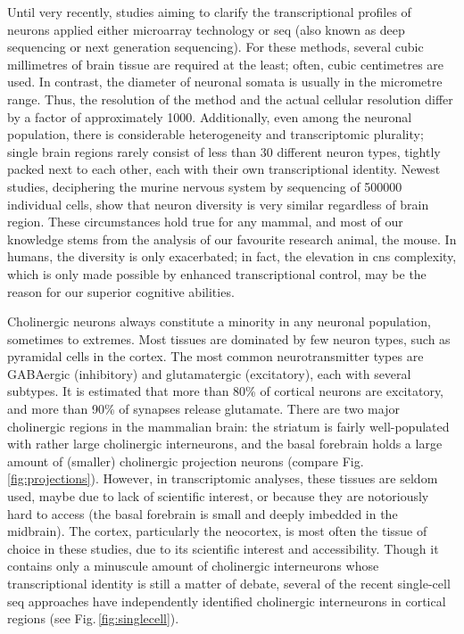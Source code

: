 Until very recently, studies aiming to clarify the transcriptional profiles of neurons applied either microarray technology or \ac{seq} (also known as deep sequencing or next generation sequencing). For these methods, several cubic millimetres of brain tissue are required at the least; often, cubic centimetres are used. In contrast, the diameter of neuronal somata is usually in the micrometre range. Thus, the resolution of the method and the actual cellular resolution differ by a factor of approximately \num{1000}. Additionally, even among the neuronal population, there is considerable heterogeneity and transcriptomic plurality; single brain regions rarely consist of less than 30 different neuron types, tightly packed next to each other, each with their own transcriptional identity.\cite{Darmanis2015, Zeisel2015, Tasic2016, Habib2016} Newest studies, deciphering the murine nervous system by sequencing of \num{500000} individual cells, show that neuron diversity is very similar regardless of brain region.\cite{Zeisel2018} These circumstances hold true for any mammal, and most of our knowledge stems from the analysis of our favourite research animal, the mouse. In humans, the diversity is only exacerbated; in fact, the elevation in \ac{cns} complexity, which is only made possible by enhanced transcriptional control, may be the reason for our superior cognitive abilities.\cite{Ataman2016, Hardingham2018, Yap2018}

Cholinergic neurons always constitute a minority in any neuronal population, sometimes to extremes. Most tissues are dominated by few neuron types, such as pyramidal cells in the cortex. The most common neurotransmitter types are GABAergic (inhibitory) and glutamatergic (excitatory), each with several subtypes. It is estimated that more than 80\% of cortical neurons are excitatory, and more than 90\% of synapses release glutamate.\cite{Raichle2002} There are two major cholinergic regions in the mammalian brain: the striatum is fairly well-populated with rather large cholinergic interneurons, and the basal forebrain holds a large amount of (smaller) cholinergic projection neurons (compare Fig.\,\ref{fig:projections}). However, in transcriptomic analyses, these tissues are seldom used, maybe due to lack of scientific interest, or because they are notoriously hard to access (the basal forebrain is small and deeply imbedded in the midbrain). The cortex, particularly the neocortex, is most often the tissue of choice in these studies, due to its scientific interest and accessibility. Though it contains only a minuscule amount of cholinergic interneurons whose transcriptional identity is still a matter of debate, several of the recent single-cell \ac{seq} approaches have independently identified cholinergic interneurons in cortical regions (see Fig.\,\ref{fig:singlecell}).

